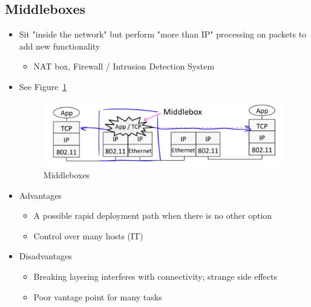 \documentclass[12pt]{ctexart}   %
\begin{document}
	\subsection{Middleboxes}
	\begin{itemize}
		\item Sit "inside the network" but perform "more than IP" processing on packets to add new functionality
		\begin{itemize}
			\item NAT box, Firewall / Intrusion Detection System
		\end{itemize}
		\item See Figure~\ref{fig:4-10-2}
		
		\begin{figure}[h!] %
		\centering
		 \includegraphics[scale=0.7]{images/4-10-2}
		\caption{ Middleboxes }
		 \label{fig:4-10-2}
		 \end{figure}
		 
		 \item Advantages
		 \begin{itemize}
		 	\item A possible rapid deployment path when there is no other option
		 	\item Control over many hosts (IT)
		 \end{itemize}
		 
		 \item Disadvantages
		 \begin{itemize}
		 	\item Breaking layering interferes with connectivity; strange side effects
		 	\item Poor vantage point for many tasks
		 \end{itemize}
	\end{itemize}
	
\end{document}
